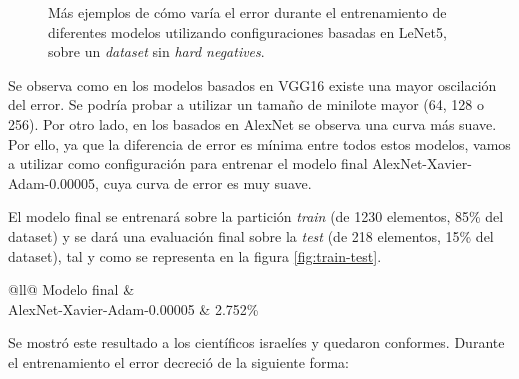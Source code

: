 \begin{figure}[H]
    \caption{Más ejemplos de cómo varía el error durante el entrenamiento de diferentes modelos utilizando configuraciones basadas en LeNet5, sobre un \textit{dataset} sin \textit{hard negatives}.}
\end{figure}

Se observa como en los modelos basados en VGG16 existe una mayor oscilación del error. Se podría probar a utilizar un tamaño de minilote mayor (64, 128 o 256). Por otro lado, en los basados en AlexNet se observa una curva más suave. Por ello, ya que la diferencia de error es mínima entre todos estos modelos, vamos a utilizar como configuración para entrenar el modelo final AlexNet-Xavier-Adam-0.00005, cuya curva de error es muy suave.

El modelo final se entrenará sobre la partición \textit{train} (de 1230 elementos, 85\% del dataset) y se dará una evaluación final sobre la \textit{test} (de 218 elementos, 15\% del dataset), tal y como se representa en la figura \ref{fig:train-test}.

\begin{table}[H]
    \footnotesize
    \centering
    \caption{Porcentaje de error del modelo final sin \textit{hard negatives}.}
\begin{tabular}{@{}ll@{}}
\toprule
Modelo final              &  \\ \midrule
AlexNet-Xavier-Adam-0.00005 & 2.752\%                                                                                        \\ \bottomrule
\end{tabular}
\end{table}

Se mostró este resultado a los científicos israelíes y quedaron conformes. Durante el entrenamiento el error decreció de la siguiente forma:

